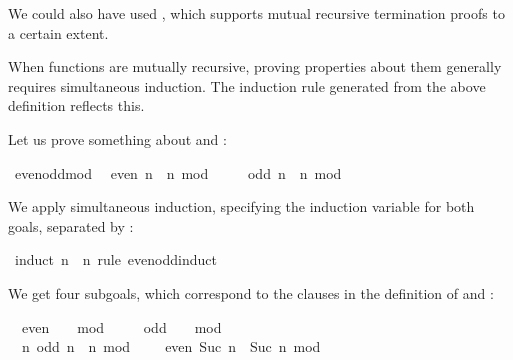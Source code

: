 \begin{isabellebody}
\endisatagproof
{\isafoldproof}%
%
\isadelimproof
%
\endisadelimproof
%
\begin{isamarkuptext}%
We could also have used , which
  supports mutual recursive termination proofs to a certain extent.%
\end{isamarkuptext}%
\isamarkuptrue%
%
\isamarkuptrue%
%
\begin{isamarkuptext}%
When functions are mutually recursive, proving properties about them
  generally requires simultaneous induction. The induction rule 
  generated from the above definition reflects this.

  Let us prove something about  and :%
\end{isamarkuptext}%
\isamarkuptrue%
\isamarkupfalse%
\ even{\isacharunderscore}odd{\isacharunderscore}mod{}{\isacharcolon}\isanewline
\ \ {\isachardoublequoteopen}even\ n\ {\isacharequal}\ {\isacharparenleft}n\ mod\ {}\ {\isacharequal}\ {}{\isacharparenright}{\isachardoublequoteclose}\isanewline
\ \ {\isachardoublequoteopen}odd\ n\ {\isacharequal}\ {\isacharparenleft}n\ mod\ {}\ {\isacharequal}\ {}{\isacharparenright}{\isachardoublequoteclose}%
\isadelimproof
%
\endisadelimproof
%
\isatagproof
%
\begin{isamarkuptxt}%
We apply simultaneous induction, specifying the induction variable
  for both goals, separated by :%
\end{isamarkuptxt}%
\isamarkuptrue%
\isamarkupfalse%
\ {\isacharparenleft}induct\ n\ \ n\ rule{\isacharcolon}\ even{\isacharunderscore}odd{\isachardot}induct{\isacharparenright}%
\begin{isamarkuptxt}%
We get four subgoals, which correspond to the clauses in the
  definition of  and :
  \begin{isabelle}%
\ {}{\isachardot}\ even\ {}\ {\isacharequal}\ {\isacharparenleft}{}\ mod\ {}\ {\isacharequal}\ {}{\isacharparenright}\isanewline
\ {}{\isachardot}\ odd\ {}\ {\isacharequal}\ {\isacharparenleft}{}\ mod\ {}\ {\isacharequal}\ {}{\isacharparenright}\isanewline
\ {}{\isachardot}\ {\isasymAnd}n{\isachardot}\ odd\ n\ {\isacharequal}\ {\isacharparenleft}n\ mod\ {}\ {\isacharequal}\ {}{\isacharparenright}\ {\isasymLongrightarrow}\ even\ {\isacharparenleft}Suc\ n{\isacharparenright}\ {\isacharequal}\ {\isacharparenleft}Suc\ n\ mod\ {}\ {\isacharequal}\ {}{\isacharparenright}\isanewline

\end{isabelle}
\end{isamarkuptxt}
\end{isabellebody}
